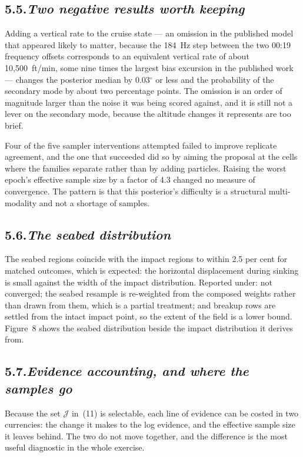 \documentclass[12pt,a4paper]{article}
\begin{document}
\subsection*{5.5.\quad \textit{Two negative results worth keeping}}

Adding a vertical rate to the cruise state --- an omission in the published model that appeared
likely to matter, because the 184~Hz step between the two 00:19 frequency offsets corresponds to
an equivalent vertical rate of about 10{,}500~ft/min, some nine times the largest bias excursion
in the published work --- changes the posterior median by 0.03$^\circ$ or less and the
probability of the secondary mode by about two percentage points. The omission is an order of
magnitude larger than the noise it was being scored against, and it is still not a lever on the
secondary mode, because the altitude changes it represents are too brief.

Four of the five sampler interventions attempted failed to improve replicate agreement, and the
one that succeeded did so by aiming the proposal at the cells where the families separate rather
than by adding particles. Raising the worst epoch's effective sample size by a factor of 4.3
changed no measure of convergence. The pattern is that this posterior's difficulty is a
structural multi-modality and not a shortage of samples.

\subsection*{5.6.\quad \textit{The seabed distribution}}

The seabed regions coincide with the impact regions to within 2.5 per cent for matched outcomes,
which is expected: the horizontal displacement during sinking is small against the width of the
impact distribution. Reported under: not converged; the seabed resample is re-weighted from the
composed weights rather than drawn from them, which is a partial treatment; and breakup rows are
settled from the intact impact point, so the extent of the field is a lower bound.
Figure~8 shows the seabed distribution beside the impact distribution it derives from.

\subsection*{5.7.\quad \textit{Evidence accounting, and where the samples go}}

Because the set $\mathcal{J}$ in~(11) is selectable, each line of evidence can be costed in two
currencies: the change it makes to the log evidence, and the effective sample size it leaves
behind. The two do not move together, and the difference is the most useful diagnostic in the
whole exercise.
\end{document}
